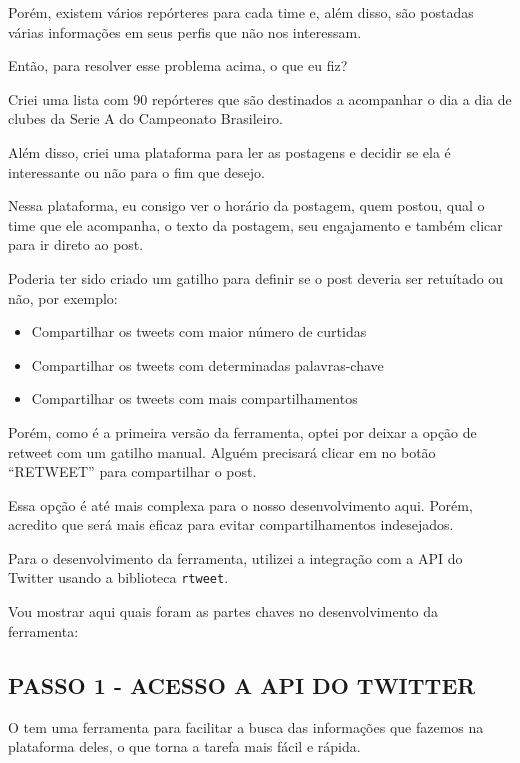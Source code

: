 \documentclass[
]{book}
\begin{document}
Porém, existem vários repórteres para cada time e, além disso, são
postadas várias informações em seus perfis que não nos interessam.

Então, para resolver esse problema acima, o que eu fiz?

Criei uma lista com 90 repórteres que são destinados a acompanhar o dia
a dia de clubes da Serie A do Campeonato Brasileiro.

Além disso, criei uma plataforma para ler as postagens e decidir se ela
é interessante ou não para o fim que desejo.

Nessa plataforma, eu consigo ver o horário da postagem, quem postou,
qual o time que ele acompanha, o texto da postagem, seu engajamento e
também clicar para ir direto ao post.

Poderia ter sido criado um gatilho para definir se o post deveria ser
retuítado ou não, por exemplo:

\begin{itemize}
\item
  Compartilhar os tweets com maior número de curtidas
\item
  Compartilhar os tweets com determinadas palavras-chave
\item
  Compartilhar os tweets com mais compartilhamentos
\end{itemize}

Porém, como é a primeira versão da ferramenta, optei por deixar a opção
de retweet com um gatilho manual. Alguém precisará clicar em no botão
``RETWEET'' para compartilhar o post.

Essa opção é até mais complexa para o nosso desenvolvimento aqui. Porém,
acredito que será mais eficaz para evitar compartilhamentos indesejados.

Para o desenvolvimento da ferramenta, utilizei a integração com a API do
Twitter usando a biblioteca \texttt{rtweet}.

Vou mostrar aqui quais foram as partes chaves no desenvolvimento da
ferramenta:

\hypertarget{passo-1---acesso-a-api-do-twitter}{%
\subsection{PASSO 1 - ACESSO A API DO
TWITTER}\label{passo-1---acesso-a-api-do-twitter}}

O tem uma ferramenta para facilitar a busca das informações que fazemos
na plataforma deles, o que torna a tarefa mais fácil e rápida.
\end{document}
